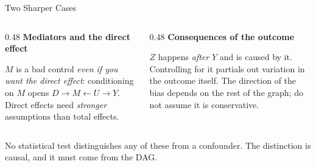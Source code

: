 \documentclass[aspectratio=169,11pt,xcolor=dvipsnames]{beamer}
\begin{document}
\begin{frame}{Two Sharper Cases}
\begin{columns}[T]
\begin{column}{0.48\textwidth}
\textbf{Mediators and the direct effect}
\begin{center}
\end{center}
{\small $M$ is a bad control \emph{even if you want the direct effect}:
conditioning on $M$ opens $D \to M \leftarrow U \to Y$. Direct effects need
\emph{stronger} assumptions than total effects.}
\end{column}
\begin{column}{0.48\textwidth}
\textbf{Consequences of the outcome}
\begin{center}
\end{center}
{\small $Z$ happens \emph{after} $Y$ and is caused by it. Controlling for it
partials out variation in the outcome itself. The direction of the bias
depends on the rest of the graph; do not assume it is conservative.}
\end{column}
\end{columns}
\vskip3pt
\alert{No statistical test distinguishes any of these from a confounder.}
The distinction is causal, and it must come from the DAG.
\end{frame}
\end{document}
